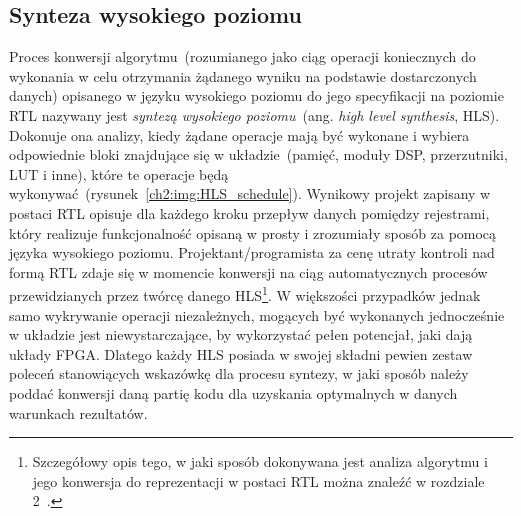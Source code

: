 \subsection{Synteza wysokiego poziomu}
Proces konwersji algorytmu~(rozumianego jako ciąg operacji koniecznych do wykonania w celu otrzymania żądanego wyniku na podstawie dostarczonych danych) opisanego w języku wysokiego poziomu do jego specyfikacji na poziomie RTL nazywany jest \textit{syntezą wysokiego poziomu}~(ang. \textit{high level synthesis}, HLS). Dokonuje ona analizy, kiedy żądane operacje mają być wykonane i wybiera odpowiednie bloki znajdujące się w układzie~(pamięć, moduły DSP, przerzutniki, LUT i inne), które te operacje będą wykonywać~(rysunek~\ref{ch2:img:HLS_schedule}). 
Wynikowy projekt zapisany w postaci RTL opisuje dla każdego kroku przepływ danych pomiędzy rejestrami, który realizuje funkcjonalność opisaną w prosty i zrozumiały sposób za pomocą języka wysokiego poziomu. Projektant/programista za cenę utraty kontroli nad formą RTL zdaje się w momencie konwersji na ciąg automatycznych procesów przewidzianych przez twórcę danego HLS\footnote{Szczegółowy opis tego, w jaki sposób dokonywana jest analiza algorytmu i jego konwersja do reprezentacji w postaci RTL można znaleźć w rozdziale 2~\cite{FPGA_SD}.}. W większości przypadków jednak samo wykrywanie operacji niezależnych, mogących być wykonanych jednocześnie w układzie jest niewystarczające, by wykorzystać pełen potencjał, jaki dają układy FPGA. Dlatego każdy HLS posiada w swojej składni pewien zestaw poleceń stanowiących wskazówkę dla procesu syntezy, w jaki sposób należy poddać konwersji daną partię kodu dla uzyskania optymalnych w danych warunkach rezultatów.

